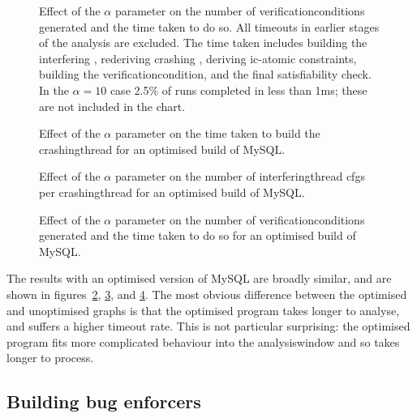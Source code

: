 \begin{figure}
  \centerline{}
  \caption{Effect of the $\alpha$ parameter on the number of
    \glspl{verificationcondition} generated and the time taken to do
    so.  All timeouts in earlier stages of the analysis are excluded.
    The time taken includes building the interfering {\StateMachine},
    rederiving crashing {\StateMachine}, deriving \gls{ic-atomic}
    constraints, building the \gls{verificationcondition}, and the
    final satisfiability check.  In the $\alpha = 10$ case 2.5\% of
    runs completed in less than 1ms; these are not included in the
    chart.}
  \label{fig:perf:alpha:gvc:unopt}
\end{figure}

\begin{figure}
  
  \caption{Effect of the $\alpha$ parameter on the time taken to build
    the \gls{crashingthread} {\StateMachines} for an optimised build
    of MySQL.}
  \label{fig:perf:alpha:bpm:opt}
\end{figure}

\begin{figure}
  
  \caption{Effect of the $\alpha$ parameter on the number of
    \gls{interferingthread} \glspl{cfg} per \gls{crashingthread}
        {\StateMachine} for an optimised build of MySQL.  }
  \label{fig:perf:alpha:gsc:opt}
\end{figure}

\begin{figure}
  
  \caption{Effect of the $\alpha$ parameter on the number of
    \glspl{verificationcondition} generated and the time taken to do
    so for an optimised build of MySQL.}
  \label{fig:perf:alpha:gvc:opt}
\end{figure}

The results with an optimised version of MySQL are broadly similar,
and are shown in figures~\ref{fig:perf:alpha:bpm:opt},
\ref{fig:perf:alpha:gsc:opt}, and \ref{fig:perf:alpha:gvc:opt}.  The
most obvious difference between the optimised and unoptimised graphs
is that the optimised program takes longer to analyse, and suffers a
higher timeout rate.  This is not particular surprising: the optimised
program fits more complicated behaviour into the \gls{analysiswindow}
and so takes longer to process.  

\subsection{Building bug enforcers}

